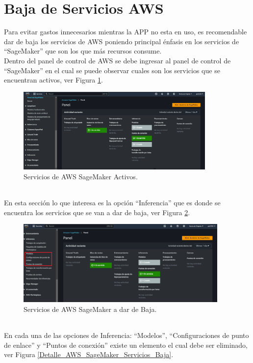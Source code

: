 \documentclass[a4paper,10pt, oneside, titlepage]{article}
\begin{document}
	\section{Baja de Servicios AWS}
	Para evitar gastos innecesarios mientras la APP no esta en uso, es recomendable dar de baja los servicios de AWS poniendo principal énfasis en los servicios de ``SageMaker'' que son los que más recursos consume. \\\newline
	\indent Dentro del panel de control de AWS se debe ingresar al panel de control de ``SageMaker'' en el cual se puede observar cuales son los servicios que se encuentran activos, ver Figura \ref{Servicios_AWS_SageMaker_Activos}.
	\begin{figure}[!h]
		\centering
		\includegraphics[width = 1\linewidth, height = 4.2cm]{Servicios_AWS_SageMaker_Activos.png}
		\caption{Servicios de AWS SageMaker Activos.}
		\label{Servicios_AWS_SageMaker_Activos}
	\end{figure} \\
	\indent En esta sección lo que interesa es la opción ``Inferencia'' que es donde se encuentra los servicios que se van a dar de baja, ver Figura \ref{AWS_SageMaker_Servicios_Baja}.
	\begin{figure}[!h]
		\centering
		\includegraphics[width = 1\linewidth, height = 4.2cm]{AWS_SageMaker_Servicios_Baja.png}
		\caption{Servicios de AWS SageMaker a dar de Baja.}
		\label{AWS_SageMaker_Servicios_Baja}
	\end{figure} \\
	\indent En cada una de las opciones de Inferencia: ``Modelos'', ``Configuraciones de punto de enlace'' y ``Puntos de conexión'' existe un elemento el cual debe ser eliminado, ver Figura \ref{Detalle_AWS_SageMaker_Servicios_Baja}.
\end{document}
